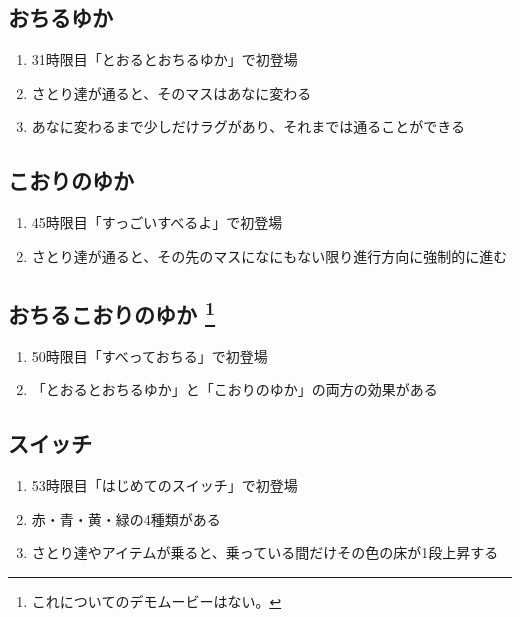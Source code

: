 \clearpage
\subsection{おちるゆか}
\begin{enumerate}[label={\sarrow}]
\item 31時限目「とおるとおちるゆか」で初登場
\item さとり達が通ると、そのマスはあなに変わる
\item あなに変わるまで少しだけラグがあり、それまでは通ることができる
\end{enumerate}


\subsection{こおりのゆか}
\begin{enumerate}[label={\sarrow}]
\item 45時限目「すっごいすべるよ」で初登場
\item さとり達が通ると、その先のマスになにもない限り進行方向に強制的に進む
\end{enumerate}


\subsection[おちるこおりのゆか]{おちるこおりのゆか%
\footnote{これについてのデモムービーはない。}%
}
\begin{enumerate}[label={\sarrow}]
\item 50時限目「すべっておちる」で初登場
\item 「とおるとおちるゆか」と「こおりのゆか」の両方の効果がある
\end{enumerate}


\subsection{スイッチ}
\begin{enumerate}[label={\sarrow}]
\item 53時限目「はじめてのスイッチ」で初登場
\item 赤・青・黄・緑の4種類がある
\item さとり達やアイテムが乗ると、乗っている間だけその色の床が1段上昇する
\end{enumerate}


